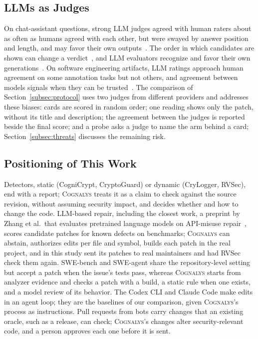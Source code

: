 \documentclass[conference]{IEEEtran}
\newcommand{\system}{\textsc{Cognalys}}
\begin{document}
\subsection{LLMs as Judges}
\label{subsec:judges-bg}

On chat-assistant questions, strong LLM judges agreed with human raters about
as often as humans agreed with each other, but were swayed by answer
position and length, and may favor their own outputs~\cite{zheng2023judge}. The order in which
candidates are shown can change a verdict~\cite{wang2024fair}, and LLM
evaluators recognize and favor their own
generations~\cite{panickssery2024selfpref}. On software engineering artifacts,
LLM ratings approach human agreement on some annotation tasks but not others,
and agreement between models signals when they can be
trusted~\cite{ahmed2025annotation}. The comparison of
Section~\ref{subsec:protocol} uses two judges from different providers and
addresses these biases: cards are scored in random order; one reading shows
only the patch, without its title and description; the agreement between
the judges is reported beside the final score; and a probe asks a judge to name the arm behind
a card; Section~\ref{subsec:threats} discusses the remaining risk.

\subsection{Positioning of This Work}

Detectors, static (CogniCrypt, CryptoGuard) or dynamic (CryLogger, RVSec), end
with a report; \system{} treats it as a claim to check against the source
revision, without assuming security impact, and decides whether and how to
change the code. LLM-based repair, including the closest work, a preprint by
Zhang et al.\ that evaluates pretrained language models on API-misuse
repair~\cite{zhang2023apimisuse}, scores candidate patches for known defects on
benchmarks; \system{} can abstain, authorizes edits per file and symbol, builds
each patch in the real project, and in this study sent its patches to real
maintainers and had RVSec check them again. SWE-bench and SWE-agent share the
repository-level setting but accept a patch when the issue's tests pass,
whereas \system{} starts from analyzer evidence and checks a patch with a
build, a static rule when one exists, and a model review of its behavior. The
Codex CLI and Claude Code make edits in an agent loop; they are the baselines
of our comparison, given \system{}'s process as instructions. Pull requests
from bots carry changes that an existing oracle, such as a release, can check;
\system{}'s changes alter security-relevant code, and a person approves each
one before it is sent.
\end{document}
